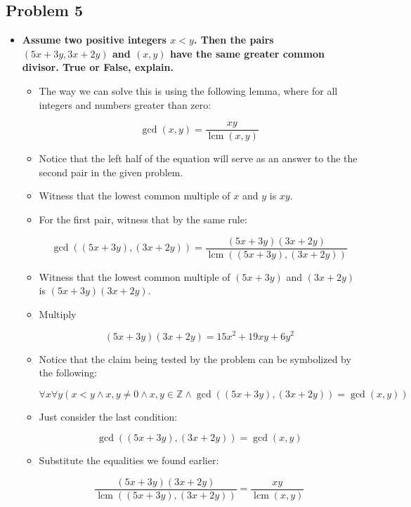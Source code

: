 \documentclass[11pt]{article}
\DeclareMathOperator{\lcm}{lcm}
\begin{document}
\subsection*{Problem 5}

\begin{itemize}
\item \textbf{Assume two positive integers $x < y$. Then the pairs
  $(5x+3y,3x+2y)$ and $(x,y)$ have the same greater common
  divisor. True or False, explain.}

\begin{itemize}

\item The way we can solve this is using the following lemma, where for
all integers and numbers greater than zero:

$$ \gcd(x, y) = \frac{xy}{\lcm(x, y)} $$

\item Notice that the left half of the equation will serve as an answer
to the the second pair in the given problem. 

\item Witness that the lowest common multiple of $x$ and $y$ is $xy$.

\item For the first pair, witness that by the same rule:

$$ \gcd((5x+3y), (3x+2y)) = \frac{(5x+3y)(3x+2y)}{\lcm((5x+3y), (3x+2y))} $$

\item Witness that the lowest common multiple of $(5x+3y)$ and $(3x+2y)$ is $(5x+3y)(3x+2y)$.

\item Multiply

$$(5x+3y)(3x+2y) = 15x^2 + 19xy + 6y^2$$

\item Notice that the claim being tested by the problem can be symbolized
by the following:

$$ \forall x \forall y (x < y \land x,y \ne 0 \land x,y \in \mathbb{Z} \land  \gcd((5x+3y), (3x+2y)) = \gcd(x, y)) $$

\item Just consider the last condition:

$$ \gcd((5x+3y), (3x+2y)) = \gcd(x, y) $$

\item Substitute the equalities we found earlier:

$$ \frac{(5x+3y)(3x+2y)}{\lcm((5x+3y), (3x+2y))} = \frac{xy}{\lcm(x, y)} $$


\end{itemize}
\end{itemize}
\end{document}
